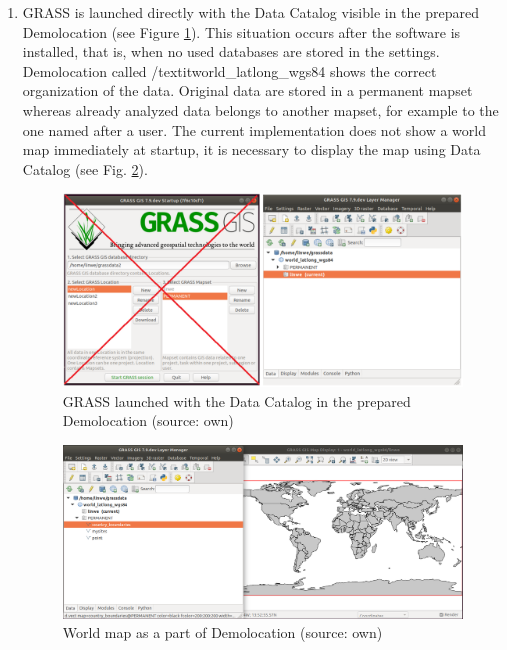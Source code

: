 \documentclass[a4paper,10pt,twoside]{article}
\begin{document}
\begin{enumerate}

\item GRASS is launched directly with the Data Catalog visible in the prepared Demolocation (see Figure \ref{fig:demolocation_startup}). This situation occurs after the software is installed, that is, when no used databases are stored in the settings. Demolocation called /textit{world\_latlong\_wgs84} shows the correct organization of the data. Original data are stored in a permanent mapset whereas already analyzed data belongs to another mapset, for example to the one named after a user. The current implementation does not show a world map immediately at startup, it is necessary to display the map using Data Catalog (see Fig. \ref{fig:demolocation}).

\begin{figure}[hbt!] 
\begin{center}
\includegraphics[width=17cm]{../pictures/demolocation_startup.png} 
\caption[GRASS launched with the Data Catalog in the prepared Demolocation]{GRASS launched with the Data Catalog in the prepared Demolocation (source: own)}
\label{fig:demolocation_startup}
\end{center}
\end{figure}

\begin{figure}[hbt!] 
\begin{center}
\includegraphics[width=17cm]{../pictures/demolocation.png} 
\caption[World map as a part of Demolocation]{World map as a part of Demolocation (source: own)}
\label{fig:demolocation}
\end{center}
\end{figure}


\end{enumerate}
\end{document}
